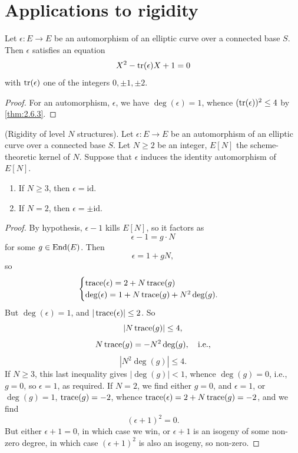 \section{Applications to rigidity}
\label{sec:2.7}

\begin{corollary}\label{cor:2.7.1}
Let $\epsilon : E \to E$ be an automorphism of an elliptic curve over a connected base $S$. Then $\epsilon$ satisfies an equation
\[
X^2 - \operatorname{tr}(\epsilon)X + 1 = 0
\]
with $\operatorname{tr}(\epsilon)$ one of the integers $0, \pm 1, \pm 2$.
\end{corollary}

\begin{proof}
For an automorphism, $\epsilon$, we have $\deg(\epsilon) = 1$, whence $(\operatorname{tr}(\epsilon))^2 \le 4$ by \eqref{thm:2.6.3}.
\end{proof}

\begin{corollary}\label{cor:2.7.2}
(Rigidity of level $N$ structures). Let $\epsilon : E \to E$ be an automorphism of an elliptic curve over a connected base $S$. Let $N \ge 2$ be an integer, $E[N]$ the scheme-theoretic kernel of $N$. Suppose that $\epsilon$ induces the identity automorphism of $E[N]$.
\begin{enumerate}
\item[(1)] If $N \ge 3$, then $\epsilon = \mathrm{id}$.
\item[(2)] If $N = 2$, then $\epsilon = \pm \mathrm{id}$.
\end{enumerate}
\end{corollary}

\begin{proof}
By hypothesis, $\epsilon - 1$ kills $E[N]$, so it factors as
\[
\epsilon - 1 = g \cdot N
\]
for some $g \in \operatorname{End}(E)$. Then
\[
\epsilon = 1 + gN,
\]
so
\[
\begin{cases}
\operatorname{trace}(\epsilon) = 2 + N \operatorname{trace}(g) \\
\deg(\epsilon) = 1 + N \operatorname{trace}(g) + N^2 \deg(g).
\end{cases}
\]
But $\deg(\epsilon) = 1$, and $|\operatorname{trace}(\epsilon)| \le 2$. So
\[
|N \operatorname{trace}(g)| \le 4,
\]
\[
N \operatorname{trace}(g) = -N^2 \deg(g), \quad \text{i.e.,}
\]
\[
|N^2 \deg(g)| \le 4.
\]
If $N \ge 3$, this last inequality gives $|\deg(g)| < 1$, whence $\deg(g) = 0$, i.e., $g = 0$, so $\epsilon = 1$, as required. If $N = 2$, we find either $g = 0$, and $\epsilon = 1$, or $\deg(g) = 1$, $\operatorname{trace}(g) = -2$, whence $\operatorname{trace}(\epsilon) = 2 + N \operatorname{trace}(g) = -2$, and we find
\[
(\epsilon + 1)^2 = 0.
\]
But either $\epsilon + 1 = 0$, in which case we win, or $\epsilon + 1$ is an isogeny of some non-zero degree, in which case $(\epsilon + 1)^2$ is also an isogeny, so non-zero.
\end{proof}

